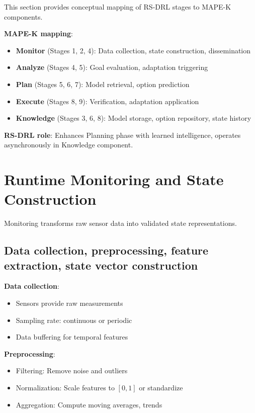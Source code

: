 \documentclass[11pt,a4paper]{article}
\begin{document}
This section provides conceptual mapping of RS-DRL stages to MAPE-K components.

\textbf{MAPE-K mapping}:
\begin{itemize}
    \item \textbf{Monitor} (Stages 1, 2, 4): Data collection, state construction, dissemination
    \item \textbf{Analyze} (Stages 4, 5): Goal evaluation, adaptation triggering
    \item \textbf{Plan} (Stages 5, 6, 7): Model retrieval, option prediction
    \item \textbf{Execute} (Stages 8, 9): Verification, adaptation application
    \item \textbf{Knowledge} (Stages 3, 6, 8): Model storage, option repository, state history
\end{itemize}

\textbf{RS-DRL role}: Enhances Planning phase with learned intelligence, operates asynchronously in Knowledge component.

\section{Runtime Monitoring and State Construction}

Monitoring transforms raw sensor data into validated state representations.

\subsection{Data collection, preprocessing, feature extraction, state vector construction}

\textbf{Data collection}:
\begin{itemize}
    \item Sensors provide raw measurements
    \item Sampling rate: continuous or periodic
    \item Data buffering for temporal features
\end{itemize}

\textbf{Preprocessing}:
\begin{itemize}
    \item Filtering: Remove noise and outliers
    \item Normalization: Scale features to $[0,1]$ or standardize
    \item Aggregation: Compute moving averages, trends
\end{itemize}
\end{document}
